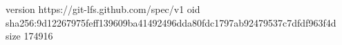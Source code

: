 version https://git-lfs.github.com/spec/v1
oid sha256:9d12267975feff139609ba41492496dda80fdc1797ab92479537c7dfdf963f4d
size 174916
